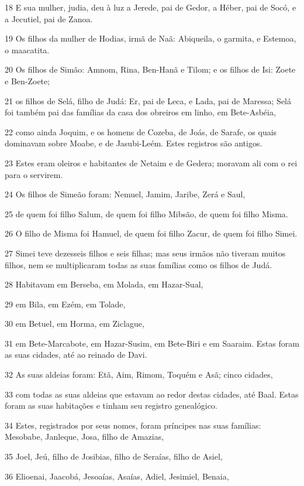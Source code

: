 \par 18 E sua mulher, judia, deu à luz a Jerede, pai de Gedor, a Héber, pai de Socó, e a Jecutiel, pai de Zanoa.
\par 19 Os filhos da mulher de Hodias, irmã de Naã: Abiqueila, o garmita, e Estemoa, o maacatita.
\par 20 Os filhos de Simão: Amnom, Rina, Ben-Hanã e Tilom; e os filhos de Isi: Zoete e Ben-Zoete;
\par 21 os filhos de Selá, filho de Judá: Er, pai de Leca, e Lada, pai de Maressa; Selá foi também pai das famílias da casa dos obreiros em linho, em Bete-Asbéia,
\par 22 como ainda Joquim, e os homens de Cozeba, de Joás, de Sarafe, os quais dominavam sobre Moabe, e de Jasubi-Leém. Estes registros são antigos.
\par 23 Estes eram oleiros e habitantes de Netaim e de Gedera; moravam ali com o rei para o servirem.
\par 24 Os filhos de Simeão foram: Nemuel, Jamim, Jaribe, Zerá e Saul,
\par 25 de quem foi filho Salum, de quem foi filho Mibsão, de quem foi filho Misma.
\par 26 O filho de Misma foi Hamuel, de quem foi filho Zacur, de quem foi filho Simei.
\par 27 Simei teve dezesseis filhos e seis filhas; mas seus irmãos não tiveram muitos filhos, nem se multiplicaram todas as suas famílias como os filhos de Judá.
\par 28 Habitavam em Berseba, em Molada, em Hazar-Sual,
\par 29 em Bila, em Ezém, em Tolade,
\par 30 em Betuel, em Horma, em Ziclague,
\par 31 em Bete-Marcabote, em Hazar-Susim, em Bete-Biri e em Saaraim. Estas foram as suas cidades, até ao reinado de Davi.
\par 32 As suas aldeias foram: Etã, Aim, Rimom, Toquém e Asã; cinco cidades,
\par 33 com todas as suas aldeias que estavam ao redor destas cidades, até Baal. Estas foram as suas habitações e tinham seu registro genealógico.
\par 34 Estes, registrados por seus nomes, foram príncipes nas suas famílias: Mesobabe, Janleque, Josa, filho de Amazias,
\par 35 Joel, Jeú, filho de Josibias, filho de Seraías, filho de Asiel,
\par 36 Elioenai, Jaacobá, Jesoaías, Asaías, Adiel, Jesimiel, Benaia,
